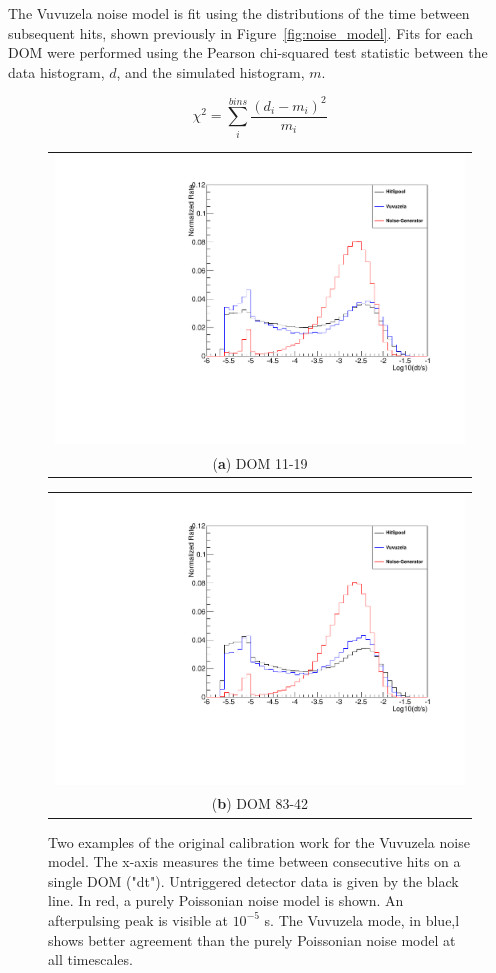 The Vuvuzela noise model is fit using the distributions of the time between subsequent hits, shown previously in Figure~\ref{fig:noise_model}.
Fits for each DOM were performed using the Pearson chi-squared test statistic between the data histogram, $d$, and the simulated histogram, $m$.

\begin{equation}
\chi^2 = \sum_i^{bins} \frac{\left(d_i-m_i\right)^2}{m_i}
\end{equation}

\begin{figure}[h]
\centering
\begin{tabular}[b]{c}
  \includegraphics[width=0.45\linewidth]{old_dom_11-19.pdf} \\
  \small (\textbf{\color{ctcolormain}a}) DOM 11-19
\end{tabular} \hspace{2pt}
\begin{tabular}[b]{c}
  \includegraphics[width=0.45\linewidth]{old_dom_83-42.pdf} \\
  \small (\textbf{\color{ctcolormain}b}) DOM 83-42
\end{tabular}
\caption[Examples of noise distributions from Vuvuzela V1 calibrations]{Two examples of the original calibration work for the Vuvuzela noise model. The x-axis measures the time between consecutive hits on a single DOM ("dt"). Untriggered detector data is given by the black line. In red, a purely Poissonian noise model is shown. An afterpulsing peak is visible at $10^{-5}$ s. The Vuvuzela mode, in blue,l shows better agreement than the purely Poissonian noise model at all timescales.}
\label{fig:old_vuvuzela_fits}
\end{figure}


